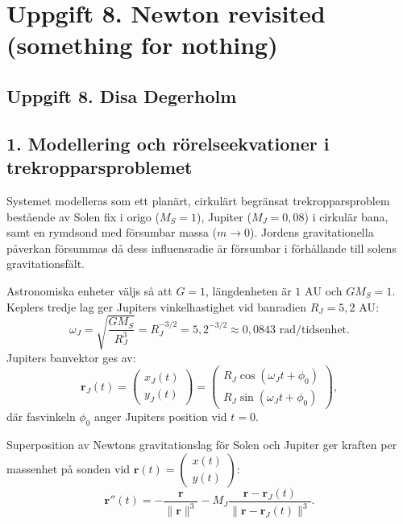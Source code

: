 \documentclass{article}
\begin{document}
\section*{Uppgift 8. Newton revisited (something for nothing)}

\subsection*{Uppgift 8. Disa Degerholm}


\subsection*{1. Modellering och rörelseekvationer i trekropparsproblemet}
Systemet modelleras som ett planärt, cirkulärt begränsat trekropparsproblem bestående av Solen fix i origo ($M_S = 1$), Jupiter ($M_J = 0{,}08$) i cirkulär bana, samt en rymdsond med försumbar massa ($m \to 0$). Jordens gravitationella påverkan försummas då dess influensradie är försumbar i förhållande till solens gravitationsfält.

Astronomiska enheter väljs så att $G = 1$, längdenheten är $1\text{ AU}$ och $G M_S = 1$. Keplers tredje lag ger Jupiters vinkelhastighet vid banradien $R_J = 5{,}2\text{ AU}$:
\begin{equation}
    \omega_J = \sqrt{\frac{G M_S}{R_J^3}} = R_J^{-3/2} = 5{,}2^{-3/2} \approx 0{,}0843\text{ rad/tidsenhet}.
\end{equation}
Jupiters banvektor ges av:
\begin{equation}
    \mathbf{r}_J(t) = \begin{pmatrix} x_J(t) \\ y_J(t) \end{pmatrix} = \begin{pmatrix} R_J \cos(\omega_J t + \phi_0) \\ R_J \sin(\omega_J t + \phi_0) \end{pmatrix},
\end{equation}
där fasvinkeln $\phi_0$ anger Jupiters position vid $t = 0$.

Superposition av Newtons gravitationslag för Solen och Jupiter ger kraften per massenhet på sonden vid $\mathbf{r}(t) = \begin{pmatrix} x(t) \\ y(t) \end{pmatrix}$:
\begin{equation}
    \mathbf{r}''(t) = -\frac{\mathbf{r}}{\|\mathbf{r}\|^3} - M_J \frac{\mathbf{r} - \mathbf{r}_J(t)}{\|\mathbf{r} - \mathbf{r}_J(t)\|^3}.
\end{equation}
\end{document}
